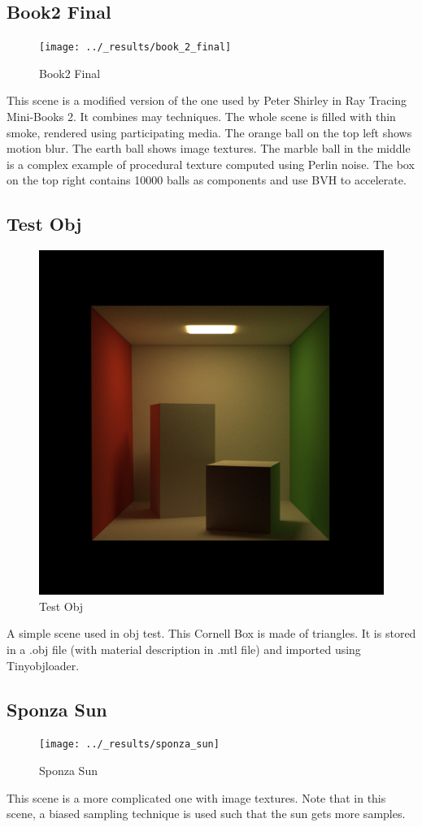 \documentclass[utf8]{article}
\begin{document}
\subsection{Book2 Final}
\begin{figure}[H]
	\centering
	\texttt{[image: ../\_results/book\_2\_final]}
	\caption{Book2 Final}
	\label{fig:book2final}
\end{figure}
This scene is a modified version of the one used by Peter Shirley in Ray Tracing Mini-Books 2. It combines may techniques. The whole scene is filled with thin smoke, rendered using participating media. The orange ball on the top left shows motion blur. The earth ball shows image textures. The marble ball in the middle is a complex example of procedural texture computed using Perlin noise. The box on the top right contains 10000 balls as components and use BVH to accelerate.

\subsection{Test Obj}
\begin{figure}[H]
	\centering
	\includegraphics[width=0.45\linewidth]{../_results/test_obj}
	\caption{Test Obj}
	\label{fig:testobj}
\end{figure}
A simple scene used in obj test. This Cornell Box is made of triangles. It is stored in a .obj file (with material description in .mtl file) and imported using Tinyobjloader.

\subsection{Sponza Sun}
\begin{figure}[H]
	\centering
	\texttt{[image: ../\_results/sponza\_sun]}
	\caption{Sponza Sun}
	\label{fig:sponzasun}
\end{figure}
This scene is a more complicated one with image textures. Note that in this scene, a biased sampling technique is used such that the sun gets more samples.
\end{document}
